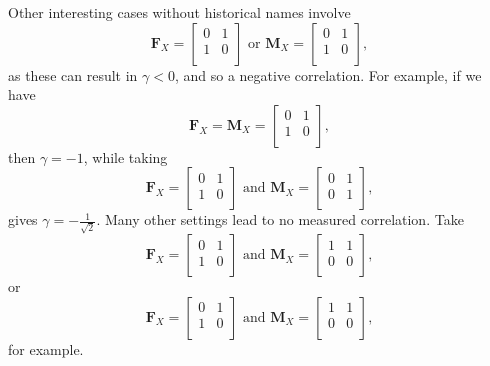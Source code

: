 \documentclass{article}
\newcommand{\m}[1]{\mathbf{#1}}               %
\begin{document}
Other interesting cases without historical names involve
$$\m{F}_X = \begin{bmatrix}
  0 & 1 \\
  1 & 0 \\
\end{bmatrix} \text{ or } \m{M}_X = \begin{bmatrix}
  0 & 1 \\
  1 & 0 \\
\end{bmatrix},$$
as these can result in $\gamma < 0$, and so a negative correlation. For example, if we have
$$\m{F}_X = \m{M}_X = \begin{bmatrix}
  0 & 1 \\
  1 & 0 \\
\end{bmatrix},$$
then $\gamma = -1$, while taking
$$\m{F}_X = \begin{bmatrix}
  0 & 1 \\
  1 & 0 \\
\end{bmatrix} \text{ and } \m{M}_X = \begin{bmatrix}
  0 & 1 \\
  0 & 1 \\
\end{bmatrix},$$
gives $\gamma = -\frac{1}{\sqrt{2}}$. Many other settings lead to no measured correlation. Take
$$\m{F}_X = \begin{bmatrix}
  0 & 1 \\
  1 & 0 \\
\end{bmatrix} \text{ and } \m{M}_X = \begin{bmatrix}
  1 & 1 \\
  0 & 0 \\
\end{bmatrix},$$
or
$$\m{F}_X = \begin{bmatrix}
  0 & 1 \\
  1 & 0 \\
\end{bmatrix} \text{ and } \m{M}_X = \begin{bmatrix}
  1 & 1 \\
  0 & 0 \\
\end{bmatrix},$$
for example.

\end{document}
